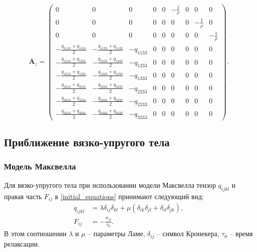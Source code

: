 \begin{displaymath}
\mathbf{A}_z =
\left( \begin{array}{cccccccccccc}
0 & 0 & 0 & 0 & 0 & -\frac 1 \rho & 0 & 0 & 0 \\ 
0 & 0 & 0 & 0 & 0 & 0 & 0 & -\frac 1 \rho & 0 \\ 
0 & 0 & 0 & 0 & 0 & 0 & 0 & 0 & -\frac 1 \rho \\ 
-\frac{q_{1113}+q_{1131}}{2} & -\frac{q_{1123}+q_{1132}}{2} & -q_{1133} & 0 & 0 & 0 & 0 & 0 & 0 \\ 
-\frac{q_{1213}+q_{1231}}{2} & -\frac{q_{1223}+q_{1232}}{2} & -q_{1233} & 0 & 0 & 0 & 0 & 0 & 0 \\ 
-\frac{q_{1313}+q_{1331}}{2} & -\frac{q_{1323}+q_{1332}}{2} & -q_{1333} & 0 & 0 & 0 & 0 & 0 & 0 \\ 
-\frac{q_{2213}+q_{2231}}{2} & -\frac{q_{2223}+q_{2232}}{2} & -q_{2233} & 0 & 0 & 0 & 0 & 0 & 0 \\ 
-\frac{q_{2313}+q_{2331}}{2} & -\frac{q_{2323}+q_{2332}}{2} & -q_{2333} & 0 & 0 & 0 & 0 & 0 & 0 \\ 
-\frac{q_{3313}+q_{3331}}{2} & -\frac{q_{3323}+q_{3332}}{2} & -q_{3333} & 0 & 0 & 0 & 0 & 0 & 0  
\end{array} \right).
\end{displaymath}


\clearpage
\newpage

\subsection{Приближение вязко-упругого тела}

\subsubsection{Модель Максвелла}
\label{viscosity_matrixes}

Для вязко-упругого тела при использовании модели Максвелла тензор $q_{ijkl}$ и правая часть $F_{ij}$ в \ref{initial_equations} принимают следующий вид:
\begin{align}
\label{tensor_qijkl_viscosity}
q_{ijkl}&=\lambda\delta_{ij}\delta_{kl}+\mu(\delta_{ik}\delta_{jl}+\delta_{il}
\delta_{jk}),\nonumber\\
F_{ij}&=-\frac{\sigma_{ij}}{\tau_0}.
\end{align}
В этом соотношении $\lambda$ и $\mu$ -- параметры Ламе, $\delta_{ij}$ -- символ Кронекера, $\tau_0$ -- время релаксации.


